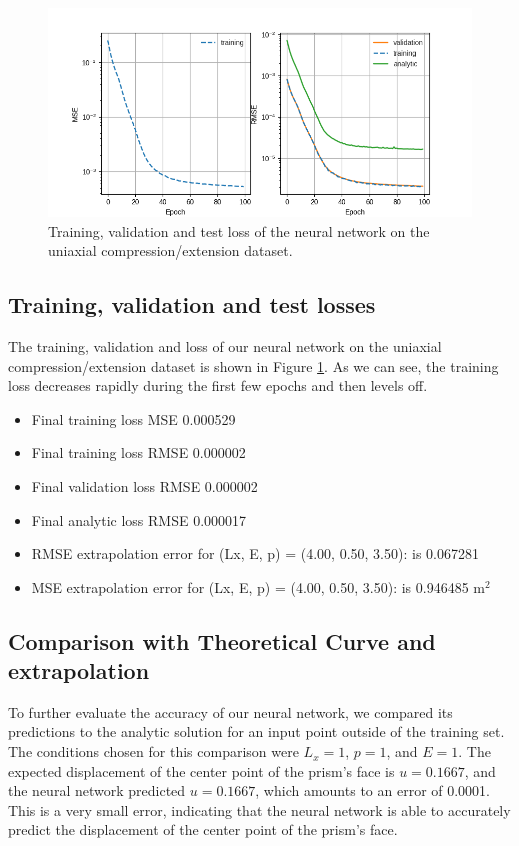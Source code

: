 \documentclass[11pt]{scrartcl} %
\begin{document}
\begin{figure}[htpb!]
	\centering
	\includegraphics[width=1\textwidth]{Figures/Example1_losses.png}
	\caption{Training, validation and test loss of the neural network on the uniaxial compression/extension dataset.}
	\label{fig:train_loss}
	\end{figure}

\subsection{Training, validation and test losses}
The training, validation and  loss of our neural network on the uniaxial compression/extension dataset is shown in Figure \ref{fig:train_loss}. As we can see, the training loss decreases rapidly during the first few epochs and then levels off. 

\begin{itemize}
\item Final training loss MSE 0.000529  
\item  Final training loss RMSE 0.000002  
\item Final validation loss RMSE 0.000002  
\item  Final analytic loss RMSE 0.000017  
\item RMSE extrapolation error for (Lx, E, p) = (4.00, 0.50, 3.50): is 0.067281
\item MSE extrapolation error for (Lx, E, p) = (4.00, 0.50, 3.50): is 0.946485 m$^2$
\end{itemize}

\subsection{Comparison with Theoretical Curve and extrapolation}
To further evaluate the accuracy of our neural network, we compared its predictions to the analytic solution for an input point outside of the training set. The conditions chosen for this comparison were $L_x = 1$, $p = 1$, and $E = 1$. The expected displacement of the center point of the prism's face is $u = 0.1667$, and the neural network predicted $u = 0.1667$, which amounts to an error of 0.0001. This is a very small error, indicating that the neural network is able to accurately predict the displacement of the center point of the prism's face.
\end{document}
